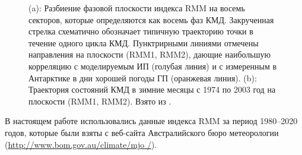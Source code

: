 \begin{figure}
\begin{subfigure}[tb]{.45\textwidth}
		\caption{}
		\label{fig:wh04_fig7}
	\end{subfigure}
    \caption{(a): Разбиение фазовой плоскости индекса RMM на восемь секторов, которые определяются как восемь фаз КМД. Закрученная стрелка схематично обозначает типичную траекторию точки в течение одного цикла КМД. Пунктрирными линиями отмечены направления на плоскости (RMM1, RMM2), дающие наибольшую корреляцию с моделируемым ИП (голубая линия) и с измеренным в Антарктике в дни хорошей погоды ГП (оранжевая линия). (b): Траектория состояний КМД в зимние месяцы с 1974 по 2003 год на плоскости (RMM1, RMM2). Взято из \cite[рис. 7]{Wheeler_Hendon_2004}.}
    \label{fig:rmm_planes}
\end{figure}

В настоящем работе использовались данные индекса RMM за период 1980--2020 годов, которые были взяты с веб-сайта Австралийского бюро метеорологии (\url{http://www.bom.gov.au/climate/mjo /}).
